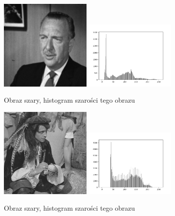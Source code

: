 \documentclass[final,a4paper,openany,12pt]{mwbk}
\begin{document}
\begin{figure}[H]
	\begin{center}
		\includegraphics[width=0.4\textwidth]{gentelman_gray}
		\includegraphics[width=0.4\textwidth]{gentelman_gray_histogram}
	\end{center}
	\caption{Obraz szary, histogram szarości tego obrazu}
\end{figure}

\begin{figure}[H]
	\begin{center}
		\includegraphics[width=0.4\textwidth]{pirate_gray}
		\includegraphics[width=0.4\textwidth]{pirate_gray_histogram}
	\end{center}
	\caption{Obraz szary, histogram szarości tego obrazu}
\end{figure}
\newpage
\end{document}
